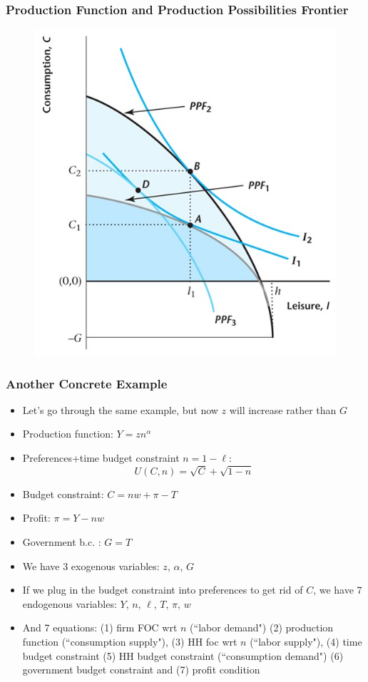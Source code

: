 \documentclass{beamer}
\begin{document}
\begin{frame}
\frametitle[alignment=center]{Production Function and Production Possibilities Frontier}
\begin{figure}
\centering
\includegraphics[scale=0.5]{Figures/W_Fig_5pt10.png}
\end{figure}
\end{frame}


\begin{frame}
\frametitle[alignment=center]{Another Concrete Example}
\begin{itemize}
\item Let's go through the same example, but now $z$ will increase rather than $G$
\item Production function:  $Y=zn^{\alpha}$
\bigskip
\item Preferences+time budget constraint  $n=1-\ell$:  
$$U(C,n)=\sqrt{C}+\sqrt{1-n}$$
\item Budget constraint:  $C=nw+\pi-T$
\bigskip
\item Profit:  $\pi=Y-nw$
\bigskip
\item Government b.c. : $G=T$
\bigskip
\item We have 3 exogenous variables: $z$, $\alpha$, $G$
\bigskip
\item If we plug in the budget constraint into preferences to get rid of $C$, we have 7 endogenous variables: $Y$, $n$, $\ell$, $T$, $\pi$, $w$
\bigskip
\item And 7 equations:  (1) firm FOC wrt $n$ (``labor demand") (2) production function (``consumption supply"), (3) HH foc wrt $n$ (``labor supply"), (4) time budget constraint (5) HH budget constraint (``consumption demand") (6) government budget constraint and (7) profit condition
\end{itemize}
\end{frame}
\end{document}

